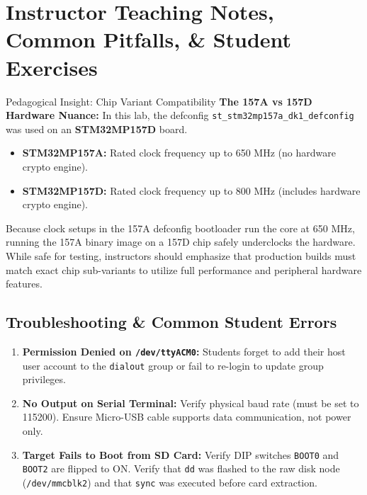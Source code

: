 \section{Instructor Teaching Notes, Common Pitfalls, \& Student Exercises}

\begin{tipbox}{Pedagogical Insight: Chip Variant Compatibility}
\textbf{The 157A vs 157D Hardware Nuance:}
In this lab, the defconfig \texttt{st\_stm32mp157a\_dk1\_defconfig} was used on an \textbf{STM32MP157D} board.
\begin{itemize}[leftmargin=*]
    \item \textbf{STM32MP157A:} Rated clock frequency up to 650 MHz (no hardware crypto engine).
    \item \textbf{STM32MP157D:} Rated clock frequency up to 800 MHz (includes hardware crypto engine).
\end{itemize}
Because clock setups in the 157A defconfig bootloader run the core at 650 MHz, running the 157A binary image on a 157D chip safely underclocks the hardware. While safe for testing, instructors should emphasize that production builds must match exact chip sub-variants to utilize full performance and peripheral hardware features.
\end{tipbox}

\subsection{Troubleshooting \& Common Student Errors}
\begin{enumerate}[leftmargin=*]
    \item \textbf{Permission Denied on \texttt{/dev/ttyACM0}:}
    Students forget to add their host user account to the \texttt{dialout} group or fail to re-login to update group privileges.
    \item \textbf{No Output on Serial Terminal:}
    Verify physical baud rate (must be set to 115200). Ensure Micro-USB cable supports data communication, not power only.
    \item \textbf{Target Fails to Boot from SD Card:}
    Verify DIP switches \texttt{BOOT0} and \texttt{BOOT2} are flipped to ON. Verify that \texttt{dd} was flashed to the raw disk node (\texttt{/dev/mmcblk2}) and that \texttt{sync} was executed before card extraction.
\end{enumerate}


